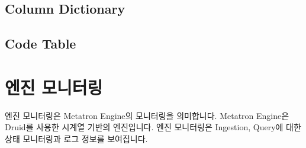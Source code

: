 \documentclass[letterpaper,10pt,english]{sphinxmanual}
\begin{document}
\section{Column Dictionary}
\label{\detokenize{discovery/part09/columndictionary:column-dictionary}}\label{\detokenize{discovery/part09/columndictionary::doc}}\begin{quote}

\begin{figure}[H]
\centering

\noindent{}
\end{figure}

\begin{figure}[H]
\centering

\noindent{}
\end{figure}

\begin{figure}[H]
\centering

\noindent{}
\end{figure}
\end{quote}


\section{Code Table}
\label{\detokenize{discovery/part09/codetable:code-table}}\label{\detokenize{discovery/part09/codetable::doc}}\begin{quote}

\begin{figure}[H]
\centering

\noindent{}
\end{figure}

\begin{figure}[H]
\centering

\noindent{}
\end{figure}

\begin{figure}[H]
\centering

\noindent{}
\end{figure}
\end{quote}


\chapter{엔진 모니터링}
\label{\detokenize{discovery/part10/index:id1}}\label{\detokenize{discovery/part10/index::doc}}
엔진 모니터링은 Metatron Engine의 모니터링을 의미합니다. Metatron Engine은 Druid를 사용한 시계열 기반의 엔진입니다.
엔진 모니터링은 Ingestion, Query에 대한 상태 모니터링과 로그 정보를 보여집니다.
\begin{quote}

\begin{figure}[H]
\centering

\noindent{}
\end{figure}
\end{quote}
\end{document}
